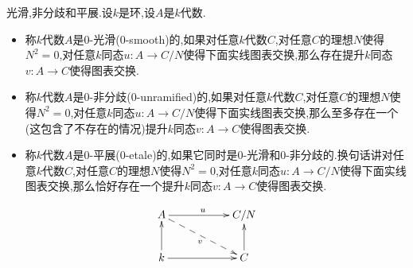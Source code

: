 光滑,非分歧和平展.设$k$是环,设$A$是$k$代数.
\begin{itemize}
	\item 称$k$代数$A$是0-光滑(0-smooth)的,如果对任意$k$代数$C$,对任意$C$的理想$N$使得$N^2=0$,对任意$k$同态$u:A\to C/N$使得下面实线图表交换,那么存在提升$k$同态$v:A\to C$使得图表交换.
	\item 称$k$代数$A$是0-非分歧(0-unramified)的,如果对任意$k$代数$C$,对任意$C$的理想$N$使得$N^2=0$,对任意$k$同态$u:A\to C/N$使得下面实线图表交换,那么至多存在一个(这包含了不存在的情况)提升$k$同态$v:A\to C$使得图表交换.
	\item 称$k$代数$A$是0-平展(0-etale)的,如果它同时是0-光滑和0-非分歧的.换句话讲对任意$k$代数$C$,对任意$C$的理想$N$使得$N^2=0$,对任意$k$同态$u:A\to C/N$使得下面实线图表交换,那么恰好存在一个提升$k$同态$v:A\to C$使得图表交换.
\end{itemize}
$$\xymatrix{A\ar[rr]^u\ar@{-->}[drr]_v&&C/N\\k\ar[u]\ar[rr]&&C\ar[u]}$$
